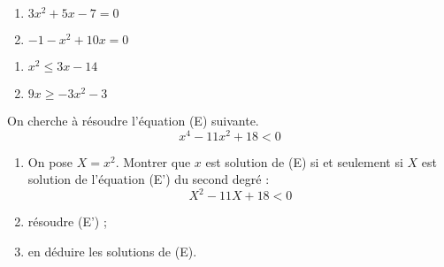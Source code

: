 \documentclass[11pt]{article}
\begin{document}
\phantom{0}
\vspace{-1.5cm}

\begin{center}
\recherche 
{}
\end{center}

\begin{exercicedevoir}
\begin{multicols}{2}
\begin{enumerate}
\item $3x^2+5x-7=0$
\item $-1-x^2+10x=0$
\end{enumerate}
\end{multicols}
\end{exercicedevoir}

\begin{exercicedevoir}
\begin{multicols}{2}
\begin{enumerate}
\item $x^2 \leq 3x-14$
\item $9x \geq -3x^2-3$
\end{enumerate}
\end{multicols}
\end{exercicedevoir}

\begin{exercicedevoir}
On cherche à résoudre l'équation (E) suivante.
\[ x^4 - 11x^2 + 18 < 0 \]

\begin{enumerate}
\item On pose \( X = x^2 \).  Montrer que \( x \) est solution de (E)
si et seulement si \( X \) est solution de l'équation (E') du second
degré : \[ X^2 - 11X + 18 < 0 \]
\item résoudre (E') ;
\item en déduire les solutions de (E).
\end{enumerate}
\end{exercicedevoir}
\end{document}
